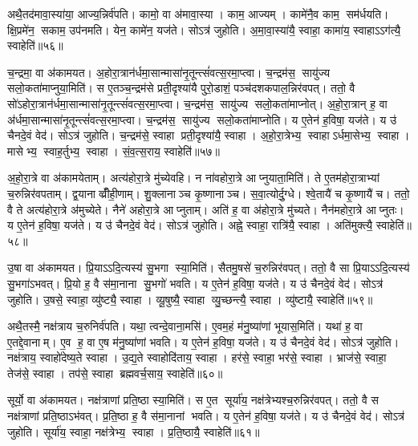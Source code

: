 अथै॒तद॑मावा॒स्या॑या॒ आज्य॒न्निर्व॑पति। कामो॒ वा अ॑मावा॒स्या। काम॒ आज्यम्। कामे॑नै॒व काम॒ सम॑र्धयति। क्षि॒प्रमे॑न॒ सकाम॒ उप॑नमति। येन॒ कामे॑न॒ यज॑ते। सोऽत्र॑ जुहोति। अ॒मा॒वा॒स्या॑यै॒ स्वाहा॒ कामा॑य॒ स्वाहाऽऽग॑त्यै॒ स्वाहेति॑॥५६॥\anuvakamend[मि॒त्र इन्द्र॑ प्र॒जाप॑ति॒र्दश॑ द॒शाप॒ एका॑दश॒ विश्वे॒ ब्रह्म॒ दश॑दश॒ विष्णु॒स्त्रयो॑दश॒ वस॑व॒ इन्द्रो॒ऽजोऽहि॒र्वै बु॒ध्निय॑ पू॒षाऽश्विनौ॑ य॒मो दश॑ द॒शाथै॒तद॑मावा॒स्या॑या अ॒ष्टौ पञ्च॑दश]

च॒न्द्रमा॒ वा अ॑कामयत। अ॒होरा॒त्रान॑र्धमा॒सान्मासा॑नृ॒तून्त्सं॑वत्स॒रमा॒प्त्वा। च॒न्द्रम॑स॒ सायु॑ज्य सलो॒कता॑माप्नुया॒मिति॑। स ए॒तञ्च॒न्द्रम॑से प्रती॒दृश्या॑यै पुरो॒डाशं॒ पञ्च॑दशकपाल॒न्निर॑वपत्। ततो॒ वै सो॑ऽहोरा॒त्रान॑र्धमा॒सान्मासा॑नृ॒तून्त्सं॑वत्स॒रमा॒प्त्वा। च॒न्द्रम॑स॒ सायु॑ज्य सलो॒कता॑माप्नोत्। अ॒हो॒रा॒त्रान् ह॒ वा अ॑र्धमा॒सान्मासा॑नृ॒तून्त्सं॑वत्स॒रमा॒प्त्वा। च॒न्द्रम॑स॒ सायु॑ज्य सलो॒कता॑माप्नोति। य ए॒तेन॑ ह॒विषा॒ यज॑ते। य उ॑ चैनदे॒वं वेद॑। सोऽत्र॑ जुहोति। च॒न्द्रम॑से॒ स्वाहा प्रती॒दृश्या॑यै॒ स्वाहा। अ॒हो॒रा॒त्रेभ्य॒ स्वाहाऽर्धमा॒सेभ्य॒ स्वाहा। मासेभ्य॒ स्वाह॒र्तुभ्य॒ स्वाहा। सं॒व॒त्स॒राय॒ स्वाहेति॑॥५७॥

अ॒हो॒रा॒त्रे वा अ॑कामयेताम्। अत्य॑होरा॒त्रे मु॑च्येवहि। न ना॑वहोरा॒त्रे आप्नुयाता॒मिति॑। ते ए॒तम॑होरा॒त्राभ्यां च॒रुन्निर॑वपताम्। द्व॒यानाव्व्रीँही॒णाम्। शु॒क्लानाञ्च कृ॒ष्णानाञ्च। स॒वा॒त्योर्दु॒ग्धे। श्वे॒तायै॑ च कृ॒ष्णायै॑ च। ततो॒ वै ते अत्य॑होरा॒त्रे अ॑मुच्येते। नैने॑ अहोरा॒त्रे आप्नुताम्। अति॑ ह॒ वा अ॑होरा॒त्रे मु॑च्यते। नैन॑महोरा॒त्रे आप्नुतः। य ए॒तेन॑ ह॒विषा॒ यज॑ते। य उ॑ चैनदे॒वं वेद॑। सोऽत्र॑ जुहोति। अह्ने॒ स्वाहा॒ रात्रि॑यै॒ स्वाहा। अति॑मुक्त्यै॒ स्वाहेति॑॥५८॥

उ॒षा वा अ॑कामयत। प्रि॒याऽऽदि॒त्यस्य॑ सु॒भगा स्या॒मिति॑। सैतमु॒षसे॑ च॒रुन्निर॑वपत्। ततो॒ वै सा प्रि॒याऽऽदि॒त्यस्य॑ सु॒भगा॑ऽभवत्। प्रि॒यो ह॒ वै स॑मा॒नाना सु॒भगो॑ भवति। य ए॒तेन॑ ह॒विषा॒ यज॑ते। य उ॑ चैनदे॒वं वेद॑। सोऽत्र॑ जुहोति। उ॒षसे॒ स्वाहा॒ व्यु॑ष्ट्यै॒ स्वाहा। व्यू॒षुष्यै॒ स्वाहा व्यु॒च्छन्त्यै॒ स्वाहा। व्यु॑ष्टायै॒ स्वाहेति॑॥५९॥

अथै॒तस्मै॒ नक्ष॑त्राय च॒रुनिर्व॑पति। यथा॒ त्वन्दे॒वाना॒मसि॑। ए॒वम॒हं म॑नु॒ष्या॑णां भूयास॒मिति॑। यथा॑ ह॒ वा ए॒तद्दे॒वानाम्। ए॒व ह॒ वा ए॒ष म॑नु॒ष्या॑णां भवति। य ए॒तेन॑ ह॒विषा॒ यज॑ते। य उ॑ चैनदे॒वं वेद॑। सोऽत्र॑ जुहोति। नक्ष॑त्राय॒ स्वाहो॑देष्य॒ते स्वाहा। उ॒द्य॒ते स्वाहोदि॑ताय॒ स्वाहा। हर॑से॒ स्वाहा॒ भर॑से॒ स्वाहा। भ्राज॑से॒ स्वाहा॒ तेज॑से॒ स्वाहा। तप॑से॒ स्वाहा ब्रह्मवर्च॒साय॒ स्वाहेति॑॥६०॥

सूर्यो॒ वा अ॑कामयत। नक्ष॑त्राणां प्रति॒ष्ठा स्या॒मिति॑। स ए॒त सूर्या॑य॒ नक्ष॑त्रेभ्यश्च॒रुन्निर॑वपत्। ततो॒ वै स नक्ष॑त्राणां प्रति॒ष्ठाऽभ॑वत्। प्र॒ति॒ष्ठा ह॒ वै स॑मा॒नानां भवति। य ए॒तेन॑ ह॒विषा॒ यज॑ते। य उ॑ चैनदे॒वं वेद॑। सोऽत्र॑ जुहोति। सूर्या॑य॒ स्वाहा॒ नक्ष॑त्रेभ्य॒ स्वाहा। प्र॒ति॒ष्ठायै॒ स्वाहेति॑॥६१॥

